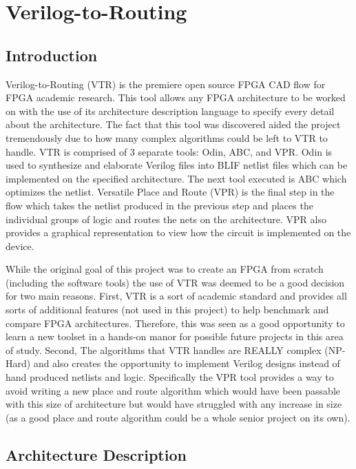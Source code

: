 \documentclass[12pt]{article}
\begin{document}
\newpage
\section{Verilog-to-Routing}

\subsection{Introduction}

Verilog-to-Routing (VTR) \cite{vtr} is the premiere open source FPGA CAD flow for FPGA academic research.
This tool allows any FPGA architecture to be worked on with the use of its architecture
description language to specify every detail about the architecture.
The fact that this tool was discovered aided the project tremendously due to how many
complex algorithms could be left to VTR to handle. VTR is comprised of 3 separate tools:
Odin, ABC, and VPR. Odin is used to synthesize and elaborate Verilog files into 
BLIF netlist files which can be
implemented on the specified architecture. The next tool executed is ABC which optimizes the
netlist. Versatile Place and Route (VPR) is the final step in the flow which takes the
netlist produced in the previous step and places the individual groups of logic 
and routes the nets on the architecture. VPR also provides a graphical representation to view
how the circuit is implemented on the device.

While the original goal of this project was to create an FPGA from scratch (including
the software tools) the use of VTR was deemed to be a good decision for two main reasons.
First, VTR is a sort of academic standard and provides all sorts of additional
features (not used in this project) to help benchmark and compare FPGA architectures.
Therefore, this was seen as a good opportunity to learn a new toolset in a hands-on manor for
possible future projects in this area of study. Second, The algorithms that VTR handles
are REALLY complex (NP-Hard) and also creates the opportunity
to implement Verilog designs instead of hand produced netlists and logic. Specifically the VPR tool
provides a way to avoid writing a new place and route algorithm which would have
been passable with this size of architecture but would have struggled with any increase
in size (as a good place and route algorithm could be a whole senior project on its own).

\subsection{Architecture Description}
\end{document}
